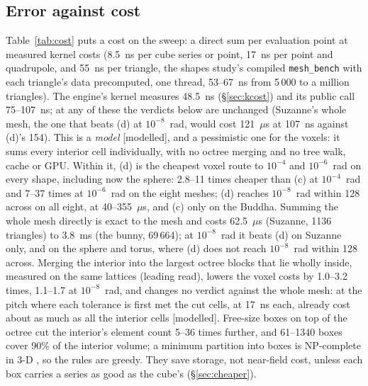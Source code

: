 \documentclass[10pt,a4paper]{article}
\newcommand{\provisional}{\textcolor{orange!70!black}{\textsf{\small[provisional --- research scripts; TASK-S5-29 regenerates this with Cavendish]}}}
\newcommand{\tagMo}{\textsf{\small[modelled]}}
\begin{document}
\subsection{Error against cost}\label{sec:costmodel}

Table~\ref{tab:cost} puts a cost on the sweep: a direct sum per
evaluation point at measured kernel costs (8.5~ns per cube series or point, 17~ns per point and
quadrupole, and 55~ns per triangle, the shapes study's compiled \texttt{mesh\_bench} with each
triangle's data precomputed, one thread, 53--67~ns from 5\,000 to a million triangles). The engine's
kernel measures 48.5~ns (\S\ref{sec:kcost}) and its public call 75--107~ns; at any of these the
verdicts below are unchanged (Suzanne's whole mesh, the one that beats (d) at $10^{-8}$~rad, would
cost 121~$\mu$s at 107~ns against (d)'s 154). This is a \emph{model}
\tagMo, and a pessimistic one for the voxels: it sums every interior cell individually, with no
octree merging and no tree walk, cache or GPU. Within it, (d) is the cheapest voxel route to $10^{-4}$ and
$10^{-6}$~rad on every shape, including now the sphere: 2.8--11 times cheaper than (c) at
$10^{-4}$~rad and 7--37 times at $10^{-6}$~rad on the eight meshes; (d) reaches $10^{-8}$~rad within
128 across on all eight, at 40--355~$\mu$s, and (c) only on the Buddha. Summing the whole mesh
directly is exact to the mesh and costs 62.5~$\mu$s (Suzanne, 1136 triangles) to 3.8~ms (the bunny,
69\,664); at $10^{-8}$~rad it beats (d) on Suzanne only, and on the sphere and torus, where (d)
does not reach $10^{-8}$~rad within 128 across. Merging the interior into the largest octree
blocks that lie wholly inside, measured on the same lattices (leading read), lowers the voxel costs by
1.0--3.2 times, 1.1--1.7 at $10^{-8}$~rad, and changes no verdict against the whole mesh: at the pitch
where each tolerance is first met the cut cells, at 17~ns each, already cost about as much as all the
interior cells \citep[\S A]{paperboxes} \tagMo. Free-size boxes on top of the octree
\citep[growth as in][]{darnell2011} cut the interior's element count 5--36 times further, and
61--1340 boxes cover 90\% of the interior volume; a minimum partition into boxes is NP-complete in 3-D
\citep{dielissen1991}, so the rules are greedy. They save storage, not near-field cost, unless each
box carries a series as good as the cube's (\S\ref{sec:cheaper}).

\begin{table}[tbp]\centering\scriptsize
\caption{Cheapest modelled cost per evaluation point ($\mu$s) to bring the 1.5~m error (RMS over
placements) below $10^{-4}$ / $10^{-6}$ / $10^{-8}$~rad within 128 cells across (--- not reached);
(e) at 4 across, the coarsest, which already meets all three. The model sums every interior cell as a
cube series (8.5~ns), with no octree merging; merging lowers the voxel columns by 1.0--3.2 times
\citep{paperboxes}. \tagMo, \texttt{paper-real-read/tables-sweep.md}. \provisional}
\label{tab:cost}

\end{table}
\end{document}
